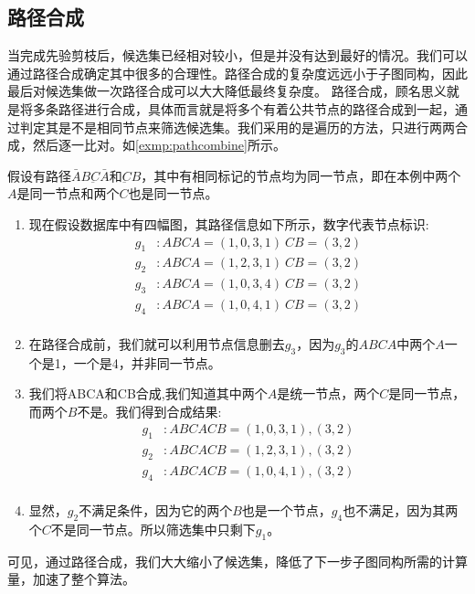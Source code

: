 \documentclass{XDBAthesis}
\numberwithin{algorithm}{chapter}
\begin{document}
\subsection{路径合成}
当完成先验剪枝后，候选集已经相对较小，但是并没有达到最好的情况。我们可以通过路径合成确定其中很多的合理性。路径合成的复杂度远远小于子图同构，因此最后对候选集做一次路径合成可以大大降低最终复杂度。
路径合成，顾名思义就是将多条路径进行合成，具体而言就是将多个有着公共节点的路径合成到一起，通过判定其是不是相同节点来筛选候选集。我们采用的是遍历的方法，只进行两两合成，然后逐一比对。如\ref{exmp:pathcombine}所示。
\begin{exmp}
    假设有路径$\bar{A}B\underbar{C}\bar{A} $和$\underbar{C}B$，其中有相同标记的节点均为同一节点，即在本例中两个$A$是同一节点和两个$C$也是同一节点。
    \label{exmp:pathcombine}
    \begin{enumerate}
        \item 现在假设数据库中有四幅图，其路径信息如下所示，数字代表节点标识:
        $$
        \begin{aligned}
            g_1 &:ABCA={(1,0,3,1)}\ CB={(3,2)}\\
            g_2 &:ABCA={(1,2,3,1)}\ CB={(3,2)}\\
            g_3 &:ABCA={(1,0,3,4)}\ CB={(3,2)}\\
            g_4 &:ABCA={(1,0,4,1)}\ CB={(3,2)}\\
        \end{aligned}
        $$
        \item 在路径合成前，我们就可以利用节点信息删去$g_3$，因为$g_3$的$ABCA$中两个$A$一个是1，一个是4，并非同一节点。
        \item 我们将ABCA和CB合成,我们知道其中两个$A$是统一节点，两个$C$是同一节点，而两个$B$不是。我们得到合成结果:
        $$
        \begin{aligned}
            g_1 &:ABCACB={(1,0,3,1),(3,2)}\\
            g_2 &:ABCACB={(1,2,3,1),(3,2)}\\
            g_4 &:ABCACB={(1,0,4,1),(3,2)}\\
        \end{aligned}
        $$
        \item  显然，$g_2$不满足条件，因为它的两个$B$也是一个节点，$g_4$也不满足，因为其两个$C$不是同一节点。所以筛选集中只剩下$g_1$。
    \end{enumerate}    
\end{exmp}
可见，通过路径合成，我们大大缩小了候选集，降低了下一步子图同构所需的计算量，加速了整个算法。
\end{document}

